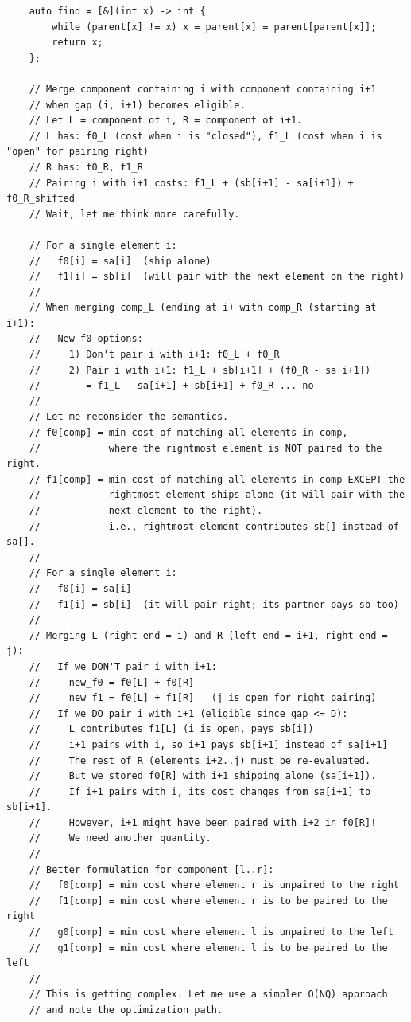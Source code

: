 \documentclass[11pt,a4paper]{article}
\begin{document}
\begin{lstlisting}
    auto find = [&](int x) -> int {
        while (parent[x] != x) x = parent[x] = parent[parent[x]];
        return x;
    };

    // Merge component containing i with component containing i+1
    // when gap (i, i+1) becomes eligible.
    // Let L = component of i, R = component of i+1.
    // L has: f0_L (cost when i is "closed"), f1_L (cost when i is "open" for pairing right)
    // R has: f0_R, f1_R
    // Pairing i with i+1 costs: f1_L + (sb[i+1] - sa[i+1]) + f0_R_shifted
    // Wait, let me think more carefully.

    // For a single element i:
    //   f0[i] = sa[i]  (ship alone)
    //   f1[i] = sb[i]  (will pair with the next element on the right)
    //
    // When merging comp_L (ending at i) with comp_R (starting at i+1):
    //   New f0 options:
    //     1) Don't pair i with i+1: f0_L + f0_R
    //     2) Pair i with i+1: f1_L + sb[i+1] + (f0_R - sa[i+1])
    //        = f1_L - sa[i+1] + sb[i+1] + f0_R ... no
    //
    // Let me reconsider the semantics.
    // f0[comp] = min cost of matching all elements in comp,
    //            where the rightmost element is NOT paired to the right.
    // f1[comp] = min cost of matching all elements in comp EXCEPT the
    //            rightmost element ships alone (it will pair with the
    //            next element to the right).
    //            i.e., rightmost element contributes sb[] instead of sa[].
    //
    // For a single element i:
    //   f0[i] = sa[i]
    //   f1[i] = sb[i]  (it will pair right; its partner pays sb too)
    //
    // Merging L (right end = i) and R (left end = i+1, right end = j):
    //   If we DON'T pair i with i+1:
    //     new_f0 = f0[L] + f0[R]
    //     new_f1 = f0[L] + f1[R]   (j is open for right pairing)
    //   If we DO pair i with i+1 (eligible since gap <= D):
    //     L contributes f1[L] (i is open, pays sb[i])
    //     i+1 pairs with i, so i+1 pays sb[i+1] instead of sa[i+1]
    //     The rest of R (elements i+2..j) must be re-evaluated.
    //     But we stored f0[R] with i+1 shipping alone (sa[i+1]).
    //     If i+1 pairs with i, its cost changes from sa[i+1] to sb[i+1].
    //     However, i+1 might have been paired with i+2 in f0[R]!
    //     We need another quantity.
    //
    // Better formulation for component [l..r]:
    //   f0[comp] = min cost where element r is unpaired to the right
    //   f1[comp] = min cost where element r is to be paired to the right
    //   g0[comp] = min cost where element l is unpaired to the left
    //   g1[comp] = min cost where element l is to be paired to the left
    //
    // This is getting complex. Let me use a simpler O(NQ) approach
    // and note the optimization path.


\end{lstlisting}
\end{document}
